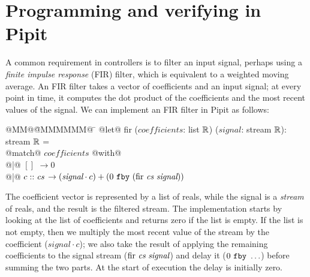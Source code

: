 \documentclass[sigplan,screen, review]{acmart}
\begin{document}

\section{Programming and verifying in Pipit}
\label{s:tut}

A common requirement in controllers is to filter an input signal, perhaps using a \emph{finite impulse response} (FIR) filter, which is equivalent to a weighted moving average.
An FIR filter takes a vector of coefficients and an input signal; at every point in time, it computes the dot product of the coefficients and the most recent values of the signal.
We can implement an FIR filter in Pipit as follows:

\newcommand\signal{\textit{signal}}
\begin{tabbing}
  @MM@\= @MMMMMM@ \= \kill
  @let@ fir ($\textit{coefficients}$: list $\mathbb{R}$) ($\signal$: stream $\mathbb{R}$): stream $\mathbb{R}$ = \\
    \> @match@ $\textit{coefficients}$ @with@ \\
    \> @|@ $[]$ \> $\to 0$ \\
    \> @|@ $c :: \textit{cs} $ \> $\to (\signal \cdot c) + (\xfby{0}{(\mbox{fir~} \cs~\signal)})$
\end{tabbing}

The coefficient vector is represented by a list of reals, while the signal is a \emph{stream} of reals, and the result is the filtered stream.
The implementation starts by looking at the list of coefficients and returns zero if the list is empty.
If the list is not empty, then we multiply the most recent value of the stream by the coefficient ($\signal \cdot c$); we also take the result of applying the remaining coefficients to the signal stream ($\mbox{fir~} \cs ~ \signal$) and delay it ($0~\texttt{fby}~\ldots$) before summing the two parts.
At the start of execution the delay is initially zero.
\end{document}
